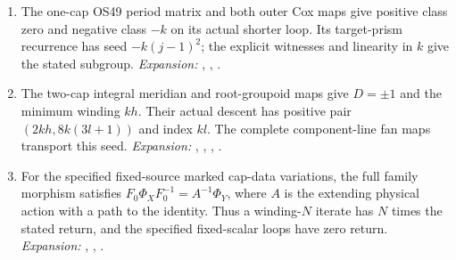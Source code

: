 \begin{enumerate}[label=\arabic*.,leftmargin=*]
\item\hypertarget{step-IV-C-5}{} The one-cap OS49 period matrix and both outer Cox maps give
positive class zero and negative class $-k$ on its actual shorter
loop. Its target-prism recurrence has seed $-k(j-1)^2$; the
explicit witnesses and linearity in $k$ give the stated subgroup.
\textit{Expansion:} , , .

\item\hypertarget{step-IV-C-6}{} The two-cap integral meridian and root-groupoid maps give
$D=\pm1$ and the minimum winding $kh$. Their actual descent
has positive pair $(2kh,8k(3l+1))$ and index $kl$.
The complete component-line fan maps transport this seed.
\textit{Expansion:} , , , .

\item\hypertarget{step-IV-C-7}{} For the specified fixed-source marked cap-data variations,
the full family morphism satisfies
$F_0\Phi_XF_0^{-1}=A^{-1}\Phi_Y$, where $A$ is the extending
physical action with a path to the identity. Thus a winding-$N$
iterate has $N$ times the stated return, and the specified
fixed-scalar loops have zero return.
\textit{Expansion:} , , .

\end{enumerate}

\hypertarget{outline-IV-D}{}
